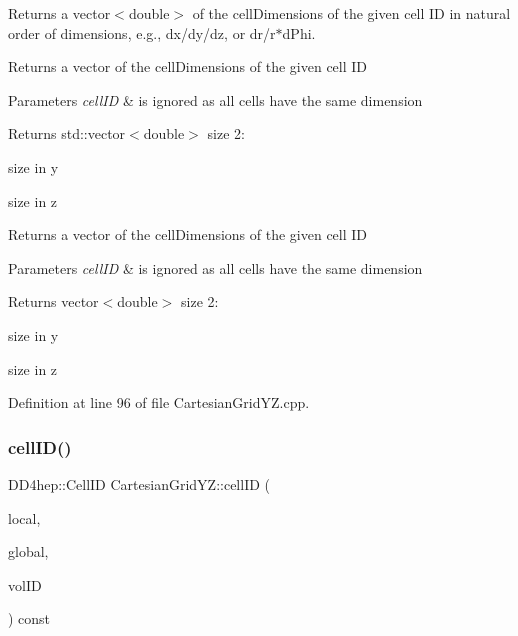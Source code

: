 Returns a vector$<$double$>$ of the cell\+Dimensions of the given cell ID in natural order of dimensions, e.\+g., dx/dy/dz, or dr/r$\ast$d\+Phi. 

Returns a vector of the cell\+Dimensions of the given cell ID 
\begin{DoxyParams}{Parameters}
{\em cell\+ID} & is ignored as all cells have the same dimension \\
\hline
\end{DoxyParams}
\begin{DoxyReturn}{Returns}
std\+::vector$<$double$>$ size 2\+:
\begin{DoxyEnumerate}
\item size in y
\item size in z
\end{DoxyEnumerate}
\end{DoxyReturn}
Returns a vector of the cell\+Dimensions of the given cell ID 
\begin{DoxyParams}{Parameters}
{\em cell\+ID} & is ignored as all cells have the same dimension \\
\hline
\end{DoxyParams}
\begin{DoxyReturn}{Returns}
vector$<$double$>$ size 2\+:
\begin{DoxyEnumerate}
\item size in y
\item size in z 
\end{DoxyEnumerate}
\end{DoxyReturn}


Definition at line 96 of file Cartesian\+Grid\+Y\+Z.\+cpp.

\hypertarget{class_d_d4hep_1_1_geometry_1_1_cartesian_grid_y_z_a90bd49763478a3495fc0f00b6284a65d}{}\label{class_d_d4hep_1_1_geometry_1_1_cartesian_grid_y_z_a90bd49763478a3495fc0f00b6284a65d} 
\subsubsection{\texorpdfstring{cell\+I\+D()}{cellID()}}
{\footnotesize\ttfamily D\+D4hep\+::\+Cell\+ID Cartesian\+Grid\+Y\+Z\+::cell\+ID (\begin{DoxyParamCaption}\item[{const \hyperlink{namespace_d_d4hep_1_1_geometry_a55083902099d03506c6db01b80404900}{Position} \&}]{local,  }\item[{const \hyperlink{namespace_d_d4hep_1_1_geometry_a55083902099d03506c6db01b80404900}{Position} \&}]{global,  }\item[{const Volume\+ID \&}]{vol\+ID }\end{DoxyParamCaption}) const}



